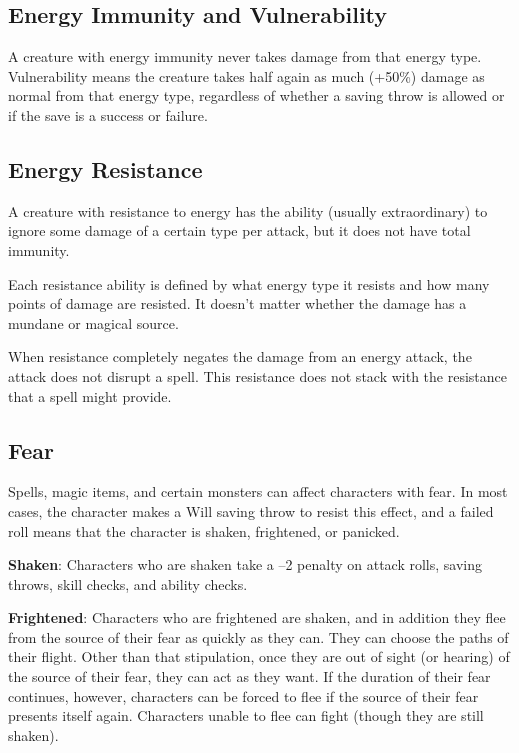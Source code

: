 \subsection{Energy Immunity and Vulnerability}

				
A creature with energy immunity never takes damage from that energy type. Vulnerability means the creature takes half again as much (+50\%) damage as normal from that energy type, regardless of whether a saving throw is allowed or if the save is a success or failure.
				
\subsection{Energy Resistance}

				
A creature with resistance to energy has the ability (usually extraordinary) to ignore some damage of a certain type per attack, but it does not have total immunity. 
				
Each resistance ability is defined by what energy type it resists and how many points of damage are resisted. It doesn't matter whether the damage has a mundane or magical source.
				
When resistance completely negates the damage from an energy attack, the attack does not disrupt a spell. This resistance does not stack with the resistance that a spell might provide.
				
\subsection{Fear}

				
Spells, magic items, and certain monsters can affect characters with fear. In most cases, the character makes a Will saving throw to resist this effect, and a failed roll means that the character is shaken, frightened, or panicked.
				
\textbf{Shaken}: Characters who are shaken take a --2 penalty on attack rolls, saving throws, skill checks, and ability checks.
				
\textbf{Frightened}: Characters who are frightened are shaken, and in addition they flee from the source of their fear as quickly as they can. They can choose the paths of their flight. Other than that stipulation, once they are out of sight (or hearing) of the source of their fear, they can act as they want. If the duration of their fear continues, however, characters can be forced to flee if the source of their fear presents itself again. Characters unable to flee can fight (though they are still shaken).
				
